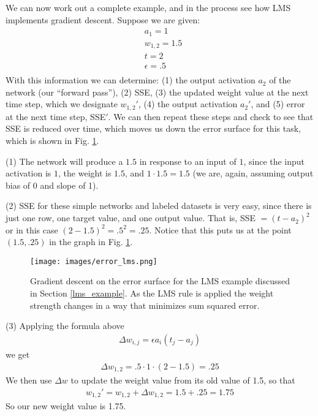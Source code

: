 We can now work out a complete example, and in the process see how LMS implements gradient descent. Suppose we are given:
\begin{eqnarray*}
& a_1 = 1 \\
& w_{1,2} = 1.5 \\
& t = 2  \\
& \epsilon = .5  \\
\end{eqnarray*}
With this information we can determine: (1) the output activation $a_2$ of the network (our ``forward pass''), (2) SSE, (3) the updated weight value at the next time step, which we designate $w_{1,2}'$, (4) the output activation $a_2'$, and (5) error at the next time step, SSE$'$. We can then repeat these steps and check to see that SSE is reduced over time, which moves us down the error surface for this task, which is shown in Fig. \ref{error_lms}.

(1) The network will produce a $1.5$ in response to an input of $1$, since the input activation is $1$, the weight is $1.5$, and $1 \cdot 1.5 = 1.5$ (we are, again, assuming output bias of 0 and slope of 1). 

(2) SSE for these simple networks and labeled datasets is very easy, since there is just one row, one target value, and one output value. That is,  SSE $= (t - a_2)^2$ or in this case $(2-1.5)^2 = .5^2 = .25$. Notice that this puts us at the point $(1.5,.25)$ in the graph in Fig. \ref{error_lms}.

\begin{figure}[h]
\centering
\texttt{[image: images/error\_lms.png]}
\caption[Jeff Yoshimi.]{Gradient descent on the error surface for the LMS example discussed in Section \ref{lms_example}. As the LMS rule is applied the weight strength changes in a way that minimizes sum squared error.}
\label{error_lms}
\end{figure}

(3) Applying the formula above
\begin{eqnarray*}
\Delta w_{i,j}  =  \epsilon a_i (t_j - a_j)
\end{eqnarray*}
we get
\begin{eqnarray*}
\Delta w_{1,2}  =  .5 \cdot 1 \cdot (2- 1.5) = .25
\end{eqnarray*}
We then use $\Delta w$ to update the weight value from its old value of 1.5, so that
\begin{eqnarray*}
w_{1,2}' = w_{1,2} + \Delta w_{1,2}  = 1.5 +.25  = 1.75
\end{eqnarray*}
So our new weight value is 1.75. 

